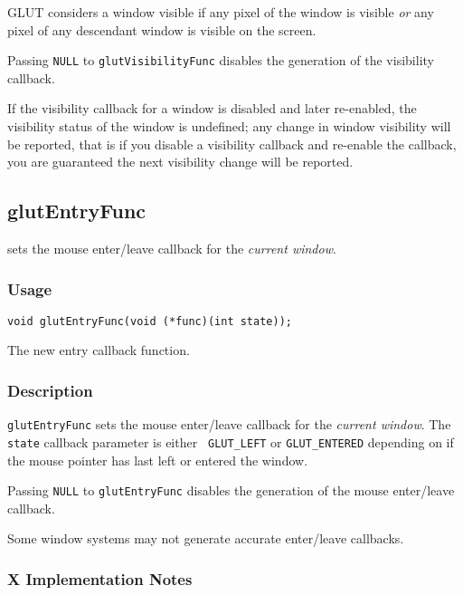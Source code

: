 GLUT considers a window visible if any pixel of the window is visible
{\em or} any pixel of any descendant window is visible on the screen.

Passing {\tt NULL} to {\tt glutVisibilityFunc}
disables the generation of the visibility callback.

If the visibility callback for a window is
disabled and later re-enabled, the visibility status of the window is
undefined; any change in window visibility will be reported, that is
if you disable a visibility callback and re-enable the callback, you
are guaranteed the next visibility change will be reported.

\subsection{glutEntryFunc}

 sets the mouse enter/leave callback for the {\em
current window}.

\subsubsection*{Usage}
\begin{verbatim}
void glutEntryFunc(void (*func)(int state));
\end{verbatim}
\begin{description}
\itemsep 0in
\item[{\tt func}]
The new entry callback function.
\end{description}

\subsubsection*{Description}

{\tt glutEntryFunc} sets the mouse enter/leave callback for the {\em
current window}.  The {\tt state} callback parameter is either {\tt
GLUT\_LEFT} or {\tt GLUT\_ENTERED} depending on if the mouse pointer
has last left or entered the window.

Passing {\tt NULL} to {\tt glutEntryFunc}
disables the generation of the mouse enter/leave callback.

Some window systems may not generate accurate enter/leave callbacks.

\subsubsection*{X Implementation Notes}

